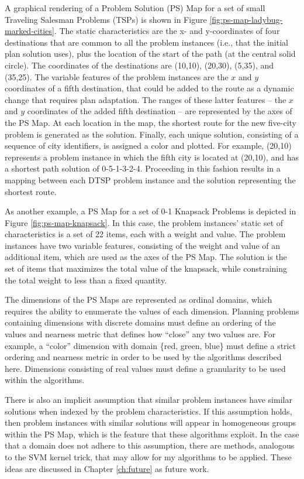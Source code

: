 A graphical rendering of a Problem Solution (PS) Map for a set of small Traveling Salesman Problems (TSPs) is shown in Figure \ref{fig:ps-map-ladybug-marked-cities}.  The static characteristics are the x- and y-coordinates of four destinations that are common to all the problem instances (i.e., that the initial plan solution uses), plus the location of the start of the path (at the central solid circle).  The coordinates of the destinations are (10,10), (20,30), (5,35), and (35,25). The variable features of the problem instances are the $x$ and $y$ coordinates of a fifth destination, that could be added to the route as a dynamic change that requires plan adaptation.  The ranges of these latter features -- the $x$ and $y$ coordinates of the added fifth destination -- are represented by the  axes of the PS Map.  At each location in the map, the shortest route for the new five-city problem is generated as the solution.  Finally, each unique solution, consisting of a sequence of city identifiers, is assigned a color and plotted.  For example, (20,10) represents a problem instance in which the fifth city is located at (20,10), and has a shortest path solution of 0-5-1-3-2-4.  Proceeding in this fashion results in a mapping between each DTSP problem instance and the solution representing the shortest route.

As another example, a PS Map for a set of 0-1 Knapsack Problems is depicted in Figure \ref{fig:ps-map-knapsack}.  In this case, the problem instances' static set of characteristics is a set of 22 items, each with a weight and value.  The problem instances have two variable features, consisting of the weight and value of an additional item, which  are used as the axes of the PS Map.  The solution is the set of items that maximizes the total value of the knapsack, while constraining the total weight to less than a fixed quantity.

The dimensions of the PS Maps are represented as ordinal domains, which requires the ability to enumerate the values of each dimension.  Planning problems containing dimensions with discrete domains must define an ordering of the values and nearness metric that defines how ``close'' any two values are.  For example, a ``color'' dimension with domain \{red, green, blue\} must define a strict ordering and nearness metric in order to be used by the algorithms described here.  Dimensions consisting of real values must define a granularity to be used within the algorithms.

There is also an implicit assumption that similar problem instances have similar solutions when indexed by the problem characteristics.  If this assumption holds, then problem instances with similar solutions will appear in homogeneous groups within the PS Map, which is the feature that these algorithms exploit. In the case that a domain does not adhere to this assumption, there are methods, analogous to the SVM kernel trick, that may allow for my algorithms to be applied.  These ideas are discussed in Chapter \ref{ch:future}  as future work.


